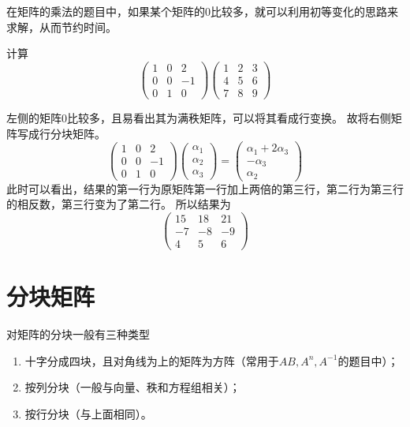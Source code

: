 在矩阵的乘法的题目中，如果某个矩阵的$0$比较多，就可以利用初等变化的思路来求解，从而节约时间。
\begin{example}
    计算
    \[
        \begin{pmatrix}
            1 & 0 & 2  \\
            0 & 0 & -1 \\
            0 & 1 & 0
        \end{pmatrix}
        \begin{pmatrix}
            1 & 2 & 3 \\
            4 & 5 & 6 \\
            7 & 8 & 9
        \end{pmatrix}
    \]
\end{example}
\begin{solution}
    左侧的矩阵$0$比较多，且易看出其为满秩矩阵，可以将其看成行变换。
    故将右侧矩阵写成行分块矩阵。
    \[
        \begin{pmatrix}
            1 & 0 & 2  \\
            0 & 0 & -1 \\
            0 & 1 & 0
        \end{pmatrix}
        \begin{pmatrix}
            \alpha_1 \\
            \alpha_2 \\
            \alpha_3
        \end{pmatrix}
        =
        \begin{pmatrix}
            \alpha_1 + 2\alpha_3 \\
            -\alpha_3            \\
            \alpha_2
        \end{pmatrix}
    \]
    此时可以看出，结果的第一行为原矩阵第一行加上两倍的第三行，第二行为第三行的相反数，第三行变为了第二行。
    所以结果为
    \[
        \begin{pmatrix}
            15 & 18 & 21 \\
            -7 & -8 & -9 \\
            4  & 5  & 6
        \end{pmatrix}
    \]
\end{solution}

\section{分块矩阵}
对矩阵的分块一般有三种类型
\begin{enumerate}[(1)]
    \item 十字分成四块，且对角线为上的矩阵为方阵（常用于$AB,A^n,A^{-1}$的题目中）；
    \item 按列分块（一般与向量、秩和方程组相关）；
    \item 按行分块（与上面相同）。
\end{enumerate}

